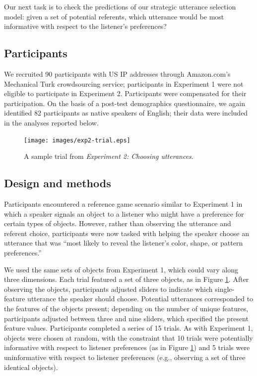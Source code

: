 \documentclass[10pt,a4paper]{article}
\begin{document}
Our next task is to check the predictions of our strategic utterance selection model: given a set of potential referents, which utterance would be most informative with respect to the listener's preferences?

\subsection{Participants}

We recruited 90 participants with US IP addresses through Amazon.com's Mechanical Turk crowdsourcing service; participants in Experiment 1 were not eligible to participate in Experiment 2. Participants were compensated for their participation. On the basis of a post-test demographics questionnaire, we again identified  82 participants as native speakers of English; their data were included in the analyses reported below.

\begin{figure}[ht]
	\centering
	\texttt{[image: images/exp2-trial.eps]}
	\caption{A sample trial from \emph{Experiment 2: Choosing utterances}.}\label{exp2-trial}
\end{figure}


\subsection{Design and methods}

Participants encountered a reference game scenario similar to Experiment 1 in which a speaker signals an object to a listener who might have a preference for certain types of objects. However, rather than observing the utterance and referent choice, participants were now tasked with helping the speaker choose an utterance that was ``most likely to reveal the listener's color, shape, or pattern preferences.''

We used the same sets of objects from Experiment 1, which could vary along three dimensions. Each trial featured a set of three objects, as in Figure \ref{exp2-trial}. After observing the objects, participants adjusted sliders to indicate which single-feature utterance the speaker should choose. Potential utterances corresponded to the features of the objects present; depending on the number of unique features, participants adjusted between three and nine sliders, which specified the present feature values. Participants completed a series of 15 trials. As with Experiment 1, objects were chosen at random, with the constraint that 10 trials were potentially informative with respect to listener preferences (as in Figure \ref{exp2-trial}) and 5 trials were uninformative with respect to listener preferences (e.g., observing a set of three identical objects). 
\end{document}
